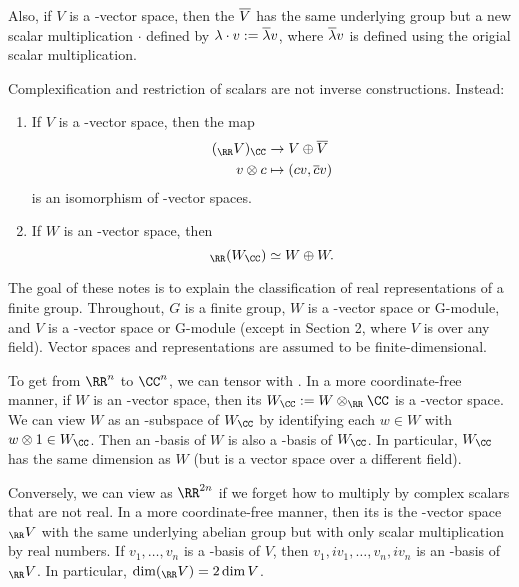 \documentclass{scrartcl}
\begin{document}
Also, if $V$ is a \CC-vector space, then the  $\overline{V}$ has the same underlying group but a new scalar multiplication $\cdot$ defined by $\lambda\cdot v := \overline{\lambda}v$, where $\overline{\lambda}v$ is defined using the origial scalar multiplication.

Complexification and restriction of scalars are not inverse constructions. Instead:
\begin{proposition}
    \hfill
    \begin{enumerate}[font=\normalfont]
        \item If $V$ is a \CC-vector space, then the map \begin{align*}
            (_{\RR} V)_{\CC} &\rightarrow V \oplus \ol{V} \\
            v\otimes c &\mapsto (cv,\ol{c}v) \\
        \end{align*} is an isomorphism of \CC-vector spaces.
        \item If $W$ is an \RR-vector space, then \[_{\RR}(W_{\CC}) \simeq W\oplus W.\]
    \end{enumerate}
\end{proposition}


The goal of these notes is to explain the classification of real representations of a finite
group. Throughout, $G$ is a finite group, $W$ is a \RR-vector space or \RR G-module, and $V$ is a
\CC-vector space or \CC G-module (except in Section 2, where $V$ is over any field). Vector spaces
and representations are assumed to be finite-dimensional.

To get from $\RR^n$ to $\CC^n$, we can tensor with \CC. In a more coordinate-free
manner, if $W$ is an \RR-vector space, then its  $W_{\CC} := W \otimes_{\RR} \CC$ is a \CC-vector
space. We can view $W$ as an \RR-subspace of $W_{\CC}$ by identifying each $w \in W$ with $w \otimes 1 \in W_{\CC}$.
Then an \RR-basis of $W$ is also a \CC-basis of $W_{\CC}$. In particular, $W_{\CC}$ has the same dimension as
$W$ (but is a vector space over a different field).

Conversely, we can view \CC[n] as $\RR^{2n}$ if we forget how to multiply by complex scalars that are not real. In a more coordinate-free manner, then its  is the \RR-vector space $_{\RR} V$ with the same underlying abelian group but with only scalar multiplication by real numbers. If $v_1,\dots,v_n$ is a \CC-basis of $V$, then $v_1, iv_1,\dots,v_n,iv_n$ is an \RR-basis of $_{\RR} V$. In particular, $\dim(_{\RR} V) = 2\dim V$.
\end{document}
